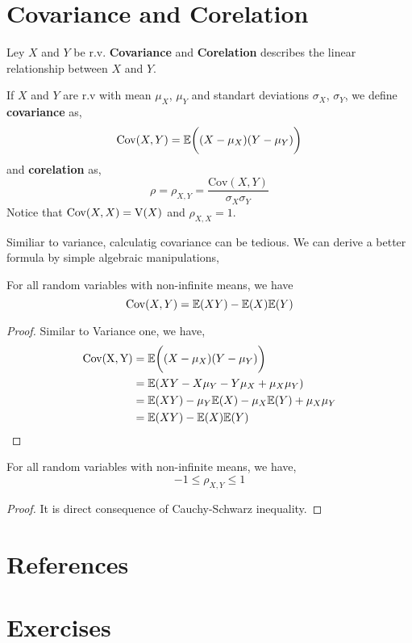 \section{Covariance and Corelation}
Ley $X$ and $Y$ be r.v.  \textbf{ Covariance} and \textbf{ Corelation} describes the linear relationship between $X$ and $Y$.
\begin{definition}
    If $X$ and $Y$ are r.v with mean $\mu_X$, $\mu_Y$ and standart deviations $\sigma_X$, $\sigma_Y$, we define \textbf{covariance} as,
    \[\mathrm{Cov}(X,Y) = {\mathbb{E}} \bigg((X- \mu_X)(Y - \mu_Y) \bigg)\]
    and \textbf{corelation} as,
    \[\rho = \rho_{X,Y} = \frac{\mathrm{Cov}(X,Y)}{\sigma_X\sigma_Y}\]
    Notice that $\mathrm{Cov}(X,X) = \operatorname{V}(X)$ and $\rho_{X,X} = 1$.
\end{definition}
Similiar to variance, calculatig covariance can be tedious. We can derive a better formula by simple algebraic manipulations,
\begin{theorem}
    For all random variables with non-infinite means, we have
    \[\mathrm{Cov}{(X,Y) = {\mathbb{E}}(XY)-{\mathbb{E}}(X){\mathbb{E}}(Y)}\]
    \begin{proof}
        Similar to Variance one, we have,
        \begin{align*}
                    \mathrm{Cov(X,Y)}  &= {\mathbb{E}} \bigg( (X- \mu_X)(Y - \mu_Y) \bigg)\\
                                        &= {\mathbb{E}} ( XY- X\mu_Y-Y\mu_X+\mu_X\mu_Y ) \\
                                        &= {\mathbb{E}}(XY) - \mu_Y{\mathbb{E}}(X) - \mu_X{\mathbb{E}}(Y) + \mu_X\mu_Y \\ 
                                        &= {\mathbb{E}}(XY) - {\mathbb{E}}(X){\mathbb{E}}(Y)
        \end{align*}
    \end{proof}
\end{theorem}
\begin{theorem}
    For all random variables with non-infinite means, we have,
    \[ -1 \le \rho_{X,Y} \le 1\]
    \begin{proof}
        It is direct consequence of Cauchy-Schwarz inequality.
    \end{proof}
\end{theorem}
\section{References}
\section{Exercises}
